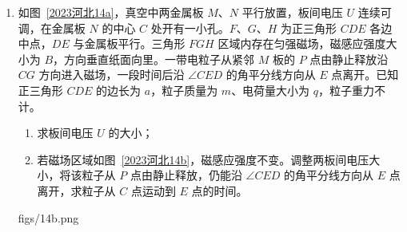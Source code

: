 \documentclass[\gkver]{gaokaozhenti}
\begin{document}
\begin{enumerate}
{$\frac{V+Sl_{1}}{T_{1}}=\frac{V_{3}}{T_{0}}$

其中

$n=\frac{V_{3}}{V_{0}}N_{A}$

联立以上各式并代入题给数据得 $n=2.9\times10^{21}$ 个
}

\item
如图~\ref{2023河北14a}，真空中两金属板 $M$、$N$ 平行放置，板间电压 $U$ 连续可调，在金属板 $N$ 的中心 $C$ 处开有一小孔。$F$、$G$、$H$ 为正三角形 $CDE$ 各边中点，$DE$ 与金属板平行。三角形 $FGH$ 区域内存在匀强磁场，磁感应强度大小为 $B$，方向垂直纸面向里。一带电粒子从紧邻 $M$ 板的 $P$ 点由静止释放沿 $CG$ 方向进入磁场，一段时间后沿 $\angle CED$ 的角平分线方向从 $E$ 点离开。已知正三角形 $CDE$ 的边长为 $a$，粒子质量为 $m$、电荷量大小为 $q$，粒子重力不计。
\begin{enumerate}
	\item
	求板间电压 $U$ 的大小；
	\item
	若磁场区域如图~\ref{2023河北14b}，磁感应强度不变。调整两板间电压大小，将该粒子从 $P$ 点由静止释放，仍能沿 $\angle CED$ 的角平分线方向从 $E$ 点离开，求粒子从 $C$ 点运动到 $E$ 点的时间。
\end{enumerate}

{figs/14b.png}

\end{enumerate}
\end{document}
